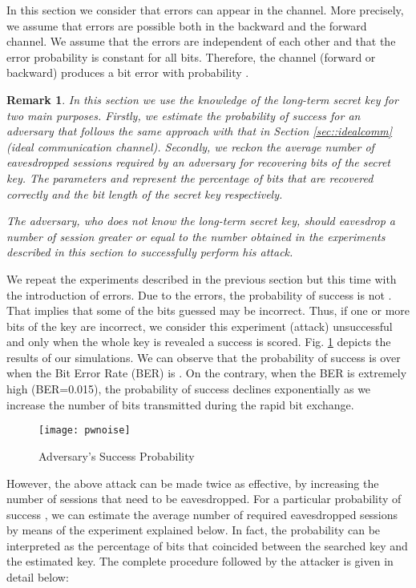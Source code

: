 \documentclass{article}
\newtheorem{remark}{Remark}
\begin{document}
In this section we consider that errors can appear in the channel. More precisely, we assume that errors are possible both in the backward and the forward channel. We assume that the errors are independent of each other and that the error probability is constant for all bits. Therefore,  the channel (forward or backward) produces a bit error with probability  .

\begin{remark}
In this section we use the knowledge of the long-term secret key for two main purposes.  Firstly, we estimate the probability of success for an adversary that follows the same approach with that in Section \ref{sec::idealcomm} (ideal communication channel). Secondly, we reckon the average number of eavesdropped sessions required by an adversary for recovering  bits of the secret key. The parameters  and  represent the percentage of bits that are recovered correctly and the bit length of the secret key respectively.

The adversary, who does not know the long-term secret key, should eavesdrop a number of session greater or equal to the number obtained in the experiments described in this section to successfully perform his attack.

\end{remark}

We repeat the experiments described in the previous section but this time with the introduction of errors. Due to the errors, the probability of success is not . That implies that some of the bits guessed may be incorrect.  Thus, if one or more bits of the key are incorrect, we consider this experiment (attack) unsuccessful and only when the whole key is revealed a success is scored.  Fig. \ref{fig::fig3} depicts the results of our simulations.  We can observe that the probability of success is over  when the Bit Error Rate (BER) is .  On the contrary, when the BER is extremely high (BER=0.015), the probability of success declines exponentially as we increase the number of bits transmitted during the rapid bit exchange.

\begin{figure}
\centering
\texttt{[image: pwnoise]}\\
  \caption{Adversary's Success Probability}\label{fig::fig3}
\end{figure}

However, the above attack can be made twice as effective, by increasing the number of sessions that need to be eavesdropped.  For a particular probability of success , we can estimate the average number of required eavesdropped sessions by means of the experiment explained below. In fact, the probability  can be interpreted as the percentage of bits that coincided between the searched key and the estimated key. The complete procedure followed by the attacker is given in detail below:
\end{document}
